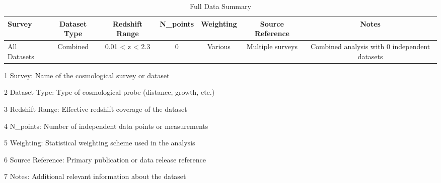 \begin{table}[htbp]
\centering
\caption{Full Data Summary}
\label{tab:full_data_summary}
\begin{tabular}{lcccccc}
\hline
Survey & Dataset Type & Redshift Range & N_points & Weighting & Source Reference & Notes \\
\hline
All Datasets & Combined & 0.01 < z < 2.3 & 0 & Various & Multiple surveys & Combined analysis with 0 independent datasets \\
\hline
\end{tabular}
\begin{tablenotes}
\small
\item[1] Survey: Name of the cosmological survey or dataset
\item[2] Dataset Type: Type of cosmological probe (distance, growth, etc.)
\item[3] Redshift Range: Effective redshift coverage of the dataset
\item[4] N_points: Number of independent data points or measurements
\item[5] Weighting: Statistical weighting scheme used in the analysis
\item[6] Source Reference: Primary publication or data release reference
\item[7] Notes: Additional relevant information about the dataset
\end{tablenotes}
\end{table}